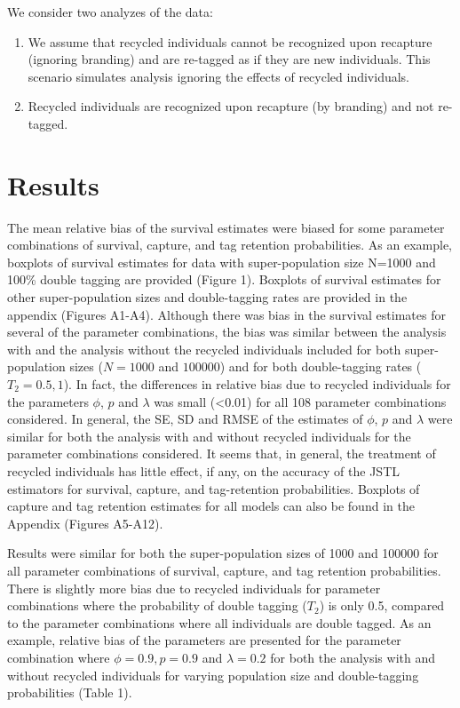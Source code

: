 \documentclass[]{article}
\begin{document}
We consider two analyzes of the data:

\begin{enumerate}
\def\labelenumi{\arabic{enumi}.}
\item
  We assume that recycled individuals cannot be recognized upon
  recapture (ignoring branding) and are re-tagged as if they are new
  individuals. This scenario simulates analysis ignoring the effects of
  recycled individuals.
\item
  Recycled individuals are recognized upon recapture (by branding) and
  not re-tagged.
\end{enumerate}



\section{Results}\label{results}

The mean relative bias of the survival estimates were biased for some
parameter combinations of survival, capture, and tag retention
probabilities. As an example, boxplots of survival estimates for data
with super-population size N=1000 and 100\% double tagging are provided
(Figure 1). Boxplots of survival estimates for other super-population
sizes and double-tagging rates are provided in the appendix (Figures
A1-A4). Although there was bias in the survival estimates for several of
the parameter combinations, the bias was similar between the analysis
with and the analysis without the recycled individuals included for both
super-population sizes (\(N=1000\) and \(100000\)) and for both
double-tagging rates (\(T_2=0.5,1\)). In fact, the differences in
relative bias due to recycled individuals for the parameters \(\phi\),
\(p\) and \(\lambda\) was small (\textless{}0.01) for all 108 parameter
combinations considered. In general, the SE, SD and RMSE of the
estimates of \(\phi\), \(p\) and \(\lambda\) were similar for both the
analysis with and without recycled individuals for the parameter
combinations considered. It seems that, in general, the treatment of
recycled individuals has little effect, if any, on the accuracy of the
JSTL estimators for survival, capture, and tag-retention probabilities.
Boxplots of capture and tag retention estimates for all models can also
be found in the Appendix (Figures A5-A12).

Results were similar for both the super-population sizes of 1000 and
100000 for all parameter combinations of survival, capture, and tag
retention probabilities. There is slightly more bias due to recycled
individuals for parameter combinations where the probability of double
tagging (\(T_2\)) is only 0.5, compared to the parameter combinations
where all individuals are double tagged. As an example, relative bias of
the parameters are presented for the parameter combination where
\(\phi=0.9, p=0.9\) and \(\lambda=0.2\) for both the analysis with and
without recycled individuals for varying population size and
double-tagging probabilities (Table 1).
\end{document}
